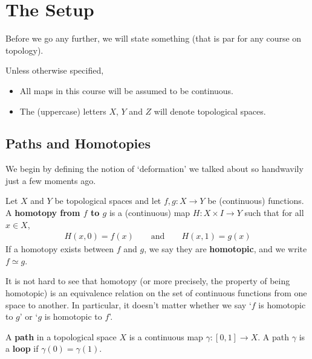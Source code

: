 \section{The Setup}

Before we go any further, we will state something (that is par for any course on topology).

\begin{boxconvention}
    Unless otherwise specified,
    \begin{itemize}
        \item All maps in this course will be assumed to be continuous.
        \item The (uppercase) letters $X$, $Y$ and $Z$ will denote topological spaces.
    \end{itemize}
\end{boxconvention}

\subsection{Paths and Homotopies}

We begin by defining the notion of `deformation' we talked about so handwavily just a few moments ago.

\begin{boxdefinition}
    Let $X$ and $Y$ be topological spaces and let $f, g : X \to Y$ be (continuous) functions. A \textbf{homotopy from $f$ to $g$} is a (continuous) map $H : X \times I \to Y$ such that for all $x \in X$,
    \begin{align*}
        H(x, 0) = f(x) \qquad \text{and} \qquad H(x, 1) = g(x)
    \end{align*}
    If a homotopy exists between $f$ and $g$, we say they are \textbf{homotopic}, and we write $f \simeq g$.
\end{boxdefinition}

It is not hard to see that homotopy (or more precisely, the property of being homotopic) is an equivalence relation on the set of continuous functions from one space to another. In particular, it doesn't matter whether we say `$f$ is homotopic to $g$' or `$g$ is homotopic to $f$'.

\begin{boxdefinition}
    A \textbf{path} in a topological space $X$ is a continuous map $\gamma : [0, 1] \to X$. A path $\gamma$ is a \textbf{loop} if $\gamma(0) = \gamma(1)$.
\end{boxdefinition}

